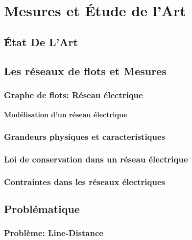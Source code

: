 \chapter{Mesures et \'Etude de l'Art}

	\section{\'Etat De L'Art}
	
	\section{Les r\'eseaux de flots et Mesures}
		\subsection{Graphe de flots: R\'eseau \'electrique}
		\subsubsection{Mod\'elisation d'un r\'eseau \'electrique}
		\subsection{Grandeurs physiques et caracteristiques}
		\subsection{Loi de conservation dans un r\'eseau \'electrique }
		\subsection{Contraintes dans les r\'eseaux \'electriques}
	
	\section{Probl\'ematique}
		\subsection{Probl\`eme: Line-Distance}
